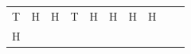 {{\begin{center}
\begin{xtabular}[t]{|l|l|l|l|l|l|l|l|l|l|}
        T &
    
    
        H &
    
    
        H &
    
    
        T &
    
    
        H &
    
    
        H &
    
    
        H &
    
    
        H%
     \tabularnewline{}
    
    
        H &
    

\end{xtabular}
\end{center}}}
